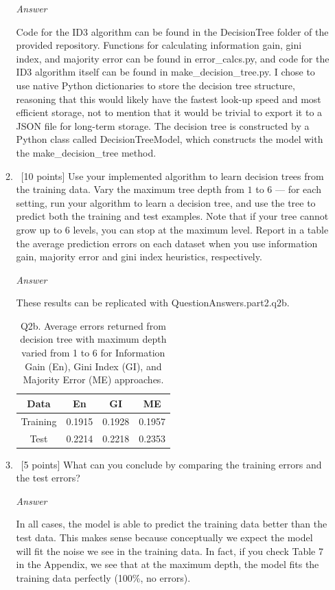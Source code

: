 \documentclass[12pt, fullpage,letterpaper]{article}
\begin{document}
\begin{enumerate}
\begin{enumerate}
\emph{Answer}

Code for the ID3 algorithm can be found in the DecisionTree folder of the provided repository. Functions for calculating information gain, gini index, and majority error can be found in error\_calcs.py, and code for the ID3 algorithm itself can be found in make\_decision\_tree.py. I chose to use native Python dictionaries to store the decision tree structure, reasoning that this would likely have the fastest look-up speed and most efficient storage, not to mention that it would be trivial to export it to a JSON file for long-term storage. The decision tree is constructed by a Python class called DecisionTreeModel, which constructs the model with the make\_decision\_tree method.

\item~[10 points] Use your implemented algorithm to learn decision trees from the training data. Vary the maximum  tree depth from $1$ to $6$  --- for each setting, run your algorithm to learn a decision tree, and use the tree to  predict both the training  and test examples. Note that if your tree cannot grow up to 6 levels, you can stop at the maximum level. Report in a table the average prediction errors on each dataset when you use information gain, majority error and gini index heuristics, respectively.

\emph{Answer}

These results can be replicated with QuestionAnswers.part2.q2b.

\begin{table}[h]
	\centering
	\begin{tabular}{c|ccc}
		Data & En & GI & ME \\ 
		\hline\hline
		Training &  0.1915 & 0.1928 & 0.1957 \\ \hline
		Test &  0.2214 & 0.2218 & 0.2353 \\ \hline
	\end{tabular}
	\caption{Q2b. Average errors returned from decision tree with maximum depth varied from 1 to 6 for Information Gain (En), Gini Index (GI), and Majority Error (ME) approaches.}
\end{table}

\item~[5 points] What can you conclude by comparing the training errors and the test errors?

\emph{Answer}

In all cases, the model is able to predict the training data better than the test data. This makes sense because conceptually we expect the model will fit the noise we see in the training data. In fact, if you check Table 7 in the Appendix, we see that at the maximum depth, the model fits the training data perfectly (100\%, no errors).


\end{enumerate}
\end{enumerate}
\end{document}
